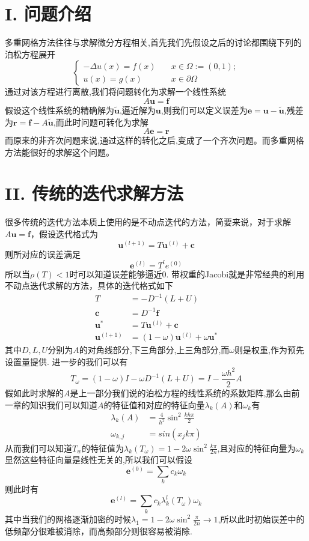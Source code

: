 \documentclass[twoside,a4paper]{article}
\begin{document}
\pagestyle{fancy}
\fancyhead{}

\section*{I. 问题介绍}
\hspace{0.8em}
多重网格方法往往与求解微分方程相关,首先我们先假设之后的讨论都围绕下列的泊松方程展开
$$
    \begin{cases}
        -\Delta u(x)=f(x)\quad & x\in \Omega:=(0,1);  \\
        u(x)=g(x)\quad         & x\in \partial \Omega
    \end{cases}
$$
通过对该方程进行离散,我们将问题转化为求解一个线性系统
$$
    A\mathbf{u}=\mathbf{f}
$$
假设这个线性系统的精确解为$\tilde{\mathbf{u}}$,逼近解为$\mathbf{u}$,则我们可以定义误差为$\mathbf{e}=\mathbf{u}-\tilde{\mathbf{u}}$,残差为$\mathbf{r}=\mathbf{f}-A\tilde{\mathbf{u}}$,而此时问题可转化为求解
$$
    A\mathbf{e}=\mathbf{r}
$$
而原来的非齐次问题来说,通过这样的转化之后,变成了一个齐次问题。而多重网格方法能很好的求解这个问题。

\section*{II. 传统的迭代求解方法}
\hspace{0.8em}
很多传统的迭代方法本质上使用的是不动点迭代的方法，简要来说，对于求解$A\mathbf{u}=\mathbf{f}$，假设迭代格式为
$$\mathbf{u}^{(l+1)}=T\mathbf{u}^{(l)}+\mathbf{c}$$
则所对应的误差满足
$$\mathbf{e}^{(l)}=T^le^{(0)}$$
所以当$\rho(T)<1$时可以知道误差能够逼近0.
带权重的Jacobi就是非常经典的利用不动点迭代求解的方法，具体的迭代格式如下
\begin{align*}
    T                  & =-D^{-1}(L+U)                                  \\
    \mathbf{c}         & =D^{-1}\mathbf{f}                              \\
    \mathbf{u}^*       & =T\mathbf{u}^{(l)}+\mathbf{c}                  \\
    \mathbf{u}^{(l+1)} & =(1-\omega)\mathbf{u}^{(l)}+\omega\mathbf{u}^*
\end{align*}
其中$D,L,U$分别为$A$的对角线部分,下三角部分,上三角部分,而$\omega$则是权重,作为预先设置量提供.
进一步的我们可以有
$$
    T_\omega=(1-\omega)I-\omega D^{-1}(L+U)=I-\frac{\omega h^2}{2}A
$$
假如此时求解的$A$是上一部分我们说的泊松方程的线性系统的系数矩阵,那么由前一章的知识我们可以知道$A$的特征值和对应的特征向量$\lambda_k(A)$和$\omega_k$有
\begin{align*}
    \lambda_k(A) & =\frac{4}{h^2}\sin^2\frac{kh\pi}{2} \\
    \omega_{k,j} & =sin(x_jk\pi)
\end{align*}
从而我们可以知道$T_w$的特征值为$\lambda_k(T_\omega)=1-2\omega\sin^2\frac{k\pi}{2n}$,且对应的特征向量为$\omega_k$
显然这些特征向量是线性无关的,所以我们可以假设
$$
    \mathbf{e}^{(0)}=\sum_k c_k\omega_k
$$
则此时有
$$
    \mathbf{e}^{(l)}=\sum_k c_k\lambda_k^l(T_\omega)\omega_k
$$
其中当我们的网格逐渐加密的时候$\lambda_1=1-2\omega\sin^2\frac{\pi}{2n}\rightarrow 1$,所以此时初始误差中的低频部分很难被消除，而高频部分则很容易被消除.
\end{document}
